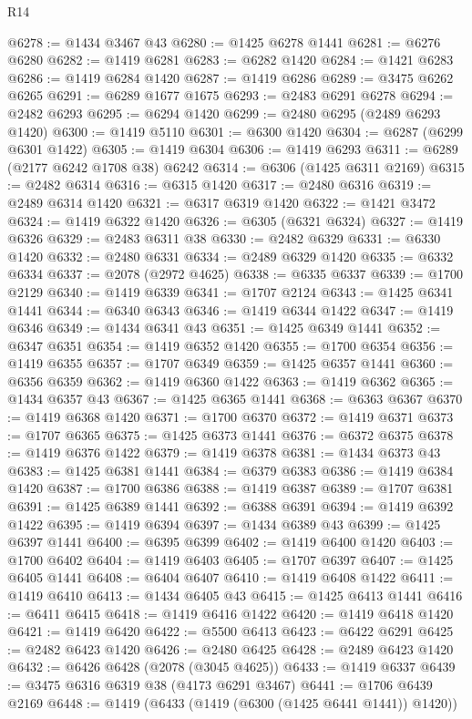 \begin{lexlean}{R14}
\begin{coremodule}
@6278 := @1434 @3467 @43
@6280 := @1425 @6278 @1441
@6281 := @6276 @6280
@6282 := @1419 @6281
@6283 := @6282 @1420
@6284 := @1421 @6283
@6286 := @1419 @6284 @1420
@6287 := @1419 @6286
@6289 := @3475 @6262 @6265
@6291 := @6289 @1677 @1675
@6293 := @2483 @6291 @6278
@6294 := @2482 @6293
@6295 := @6294 @1420
@6299 := @2480 @6295 (@2489 @6293 @1420)
@6300 := @1419 @5110
@6301 := @6300 @1420
@6304 := @6287 (@6299 @6301 @1422)
@6305 := @1419 @6304
@6306 := @1419 @6293
@6311 := @6289 (@2177 @6242 @1708 @38) @6242
@6314 := @6306 (@1425 @6311 @2169)
@6315 := @2482 @6314
@6316 := @6315 @1420
@6317 := @2480 @6316
@6319 := @2489 @6314 @1420
@6321 := @6317 @6319 @1420
@6322 := @1421 @3472
@6324 := @1419 @6322 @1420
@6326 := @6305 (@6321 @6324)
@6327 := @1419 @6326
@6329 := @2483 @6311 @38
@6330 := @2482 @6329
@6331 := @6330 @1420
@6332 := @2480 @6331
@6334 := @2489 @6329 @1420
@6335 := @6332 @6334
@6337 := @2078 (@2972 @4625)
@6338 := @6335 @6337
@6339 := @1700 @2129
@6340 := @1419 @6339
@6341 := @1707 @2124
@6343 := @1425 @6341 @1441
@6344 := @6340 @6343
@6346 := @1419 @6344 @1422
@6347 := @1419 @6346
@6349 := @1434 @6341 @43
@6351 := @1425 @6349 @1441
@6352 := @6347 @6351
@6354 := @1419 @6352 @1420
@6355 := @1700 @6354
@6356 := @1419 @6355
@6357 := @1707 @6349
@6359 := @1425 @6357 @1441
@6360 := @6356 @6359
@6362 := @1419 @6360 @1422
@6363 := @1419 @6362
@6365 := @1434 @6357 @43
@6367 := @1425 @6365 @1441
@6368 := @6363 @6367
@6370 := @1419 @6368 @1420
@6371 := @1700 @6370
@6372 := @1419 @6371
@6373 := @1707 @6365
@6375 := @1425 @6373 @1441
@6376 := @6372 @6375
@6378 := @1419 @6376 @1422
@6379 := @1419 @6378
@6381 := @1434 @6373 @43
@6383 := @1425 @6381 @1441
@6384 := @6379 @6383
@6386 := @1419 @6384 @1420
@6387 := @1700 @6386
@6388 := @1419 @6387
@6389 := @1707 @6381
@6391 := @1425 @6389 @1441
@6392 := @6388 @6391
@6394 := @1419 @6392 @1422
@6395 := @1419 @6394
@6397 := @1434 @6389 @43
@6399 := @1425 @6397 @1441
@6400 := @6395 @6399
@6402 := @1419 @6400 @1420
@6403 := @1700 @6402
@6404 := @1419 @6403
@6405 := @1707 @6397
@6407 := @1425 @6405 @1441
@6408 := @6404 @6407
@6410 := @1419 @6408 @1422
@6411 := @1419 @6410
@6413 := @1434 @6405 @43
@6415 := @1425 @6413 @1441
@6416 := @6411 @6415
@6418 := @1419 @6416 @1422
@6420 := @1419 @6418 @1420
@6421 := @1419 @6420
@6422 := @5500 @6413
@6423 := @6422 @6291
@6425 := @2482 @6423 @1420
@6426 := @2480 @6425
@6428 := @2489 @6423 @1420
@6432 := @6426 @6428 (@2078 (@3045 @4625))
@6433 := @1419 @6337
@6439 := @3475 @6316 @6319 @38 (@4173 @6291 @3467)
@6441 := @1706 @6439 @2169
@6448 := @1419 (@6433 (@1419 (@6300 (@1425 @6441 @1441)) @1420))

\end{coremodule}
\end{lexlean}
